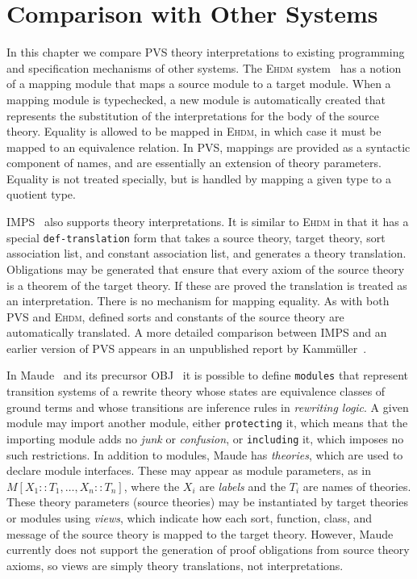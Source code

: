 \documentclass[11pt,twoside,openright,titlepage]{cslreport}
\begin{document}
\chapter{Comparison with Other Systems}

In this chapter we compare PVS theory interpretations to existing
programming and specification mechanisms of other systems.
The \textsc{Ehdm} system~\cite{EHDM:Language} has a notion of a mapping
module that maps a source module to a target module.  When a mapping
module is typechecked, a new module is automatically created that
represents the substitution of the interpretations for the body of the
source theory.  Equality is allowed to be mapped in \textsc{Ehdm}, in
which case it must be mapped to an equivalence relation.  In PVS, mappings
are provided as a syntactic component of names, and are essentially an
extension of theory parameters.  Equality is not treated specially, but is
handled by mapping a given type to a quotient type.

IMPS~\cite{Farmer:imps-cade,Farmer94} also supports theory
interpretations.  It is similar to \textsc{Ehdm} in that it has a special
\texttt{def-translation} form that takes a source theory, target
theory, sort association list, and constant association list, and generates a
theory translation.  Obligations may be generated that ensure that every
axiom of the source theory is a theorem of the target theory.  If these
are proved the translation is treated as an interpretation.  There is no
mechanism for mapping equality.  As with both PVS and \textsc{Ehdm},
defined sorts and constants of the source theory are automatically
translated.  A more detailed comparison between IMPS and an earlier
version of PVS appears in an unpublished report by
Kamm\"{u}ller~\cite{Kammuller:comparison}.

In Maude~\cite{Maude} and its precursor OBJ~\cite{OBJ:intro} it is
possible to
define \texttt{modules} that represent transition systems of a rewrite
theory whose states are equivalence classes of ground terms and whose
transitions are inference rules in \emph{rewriting logic}.  A given module
may import another module, either \texttt{protecting} it, which means that
the importing module adds no \emph{junk} or \emph{confusion}, or
\texttt{including} it, which imposes no such restrictions.  In addition to
modules, Maude has \emph{theories}, which are used to declare module
interfaces.  These may appear as module parameters, as in
$M[X_{1}::T_{1},\ldots,X_{n}::T_{n}]$, where the $X_{i}$ are \emph{labels}
and the $T_{i}$ are names of theories.  These theory parameters (source
theories) may be instantiated by target theories or modules using
\emph{views}, which indicate how each sort, function, class, and message
of the source theory is mapped to the target theory.  However, Maude
currently does not support the generation of proof obligations from source
theory axioms, so views are simply theory translations, not
interpretations.
\end{document}
